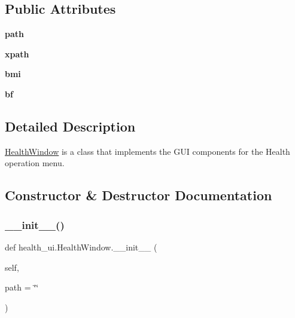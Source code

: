 \subsection*{Public Attributes}
\begin{DoxyCompactItemize}
\item 
\mbox{\label{classhealth__ui_1_1_health_window_a9b39fd0eb7f740de4266cfcc48110ff8}} 
{\bfseries path}
\item 
\mbox{\label{classhealth__ui_1_1_health_window_a1bb4f7b081abe9c24b6b84b1c3bf3903}} 
{\bfseries xpath}
\item 
\mbox{\label{classhealth__ui_1_1_health_window_ae3cbd4ee473d7a3f02023865dfcbd8c4}} 
{\bfseries bmi}
\item 
\mbox{\label{classhealth__ui_1_1_health_window_a3e1494d47145602a31a0c0bb332690aa}} 
{\bfseries bf}
\end{DoxyCompactItemize}


\subsection{Detailed Description}
\hyperlink{classhealth__ui_1_1_health_window}{Health\+Window} is a class that implements the G\+UI components for the Health operation menu. 

\subsection{Constructor \& Destructor Documentation}
\mbox{\label{classhealth__ui_1_1_health_window_aca4eb93be30367445762dc27584bfde5}} 
\subsubsection{\texorpdfstring{\+\_\+\+\_\+init\+\_\+\+\_\+()}{\_\_init\_\_()}}
{\footnotesize\ttfamily def health\+\_\+ui.\+Health\+Window.\+\_\+\+\_\+init\+\_\+\+\_\+ (\begin{DoxyParamCaption}\item[{}]{self,  }\item[{}]{path = {\ttfamily \char`\"{}\char`\"{}} }\end{DoxyParamCaption})}



